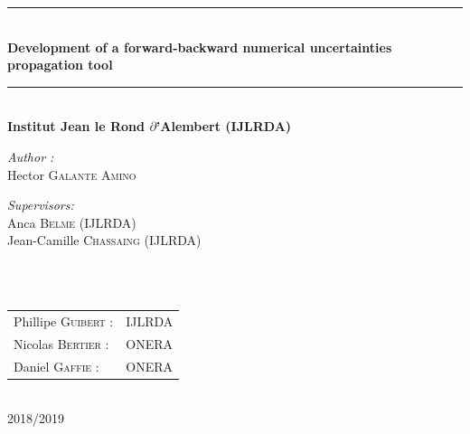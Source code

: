 \documentclass[11pt, a4paper, English]{report}
\begin{document}
\begin{titlepage}
\begin{center}
\rule{\linewidth}{0.3mm} \\[0.4cm]
{ \huge \bfseries\color{blue!40!black} Development of a forward-backward numerical uncertainties propagation tool \\[0.4cm] }
\rule{\linewidth}{0.3mm} \\[1cm]
{\large \bfseries Institut Jean le Rond $\partial$'Alembert (IJLRDA)}\\[3cm]
\noindent
\begin{minipage}{0.4\textwidth}
  \begin{flushleft} \large
    \emph{\color{red!40!black}Author :}\\
    Hector \textsc{Galante Amino}\\
  \end{flushleft}
\end{minipage}%
\begin{minipage}{0.5\textwidth}
  \begin{flushright} \large
    \emph{\color{red!40!black}Supervisors:} \\
    Anca \textsc{Belme} (IJLRDA)\\
    Jean-Camille \textsc{Chassaing} (IJLRDA)\\
  \end{flushright}
\end{minipage}\\[2cm]

\\[0.3cm]

\color{black}
\centering
\begin{tabular}{ll}
\large Phillipe \textsc{Guibert} : & \large IJLRDA \\[0.1cm]
\large Nicolas \textsc{Bertier} : & \large ONERA \\[0.1cm]
\large Daniel \textsc{Gaffie} : & \large ONERA 
\end{tabular}

\vfill

{\large \color{red!40!black}{Academic year}\\ \color{blue!40!black}2018/2019}

\end{center}
\end{titlepage}
\end{document}
